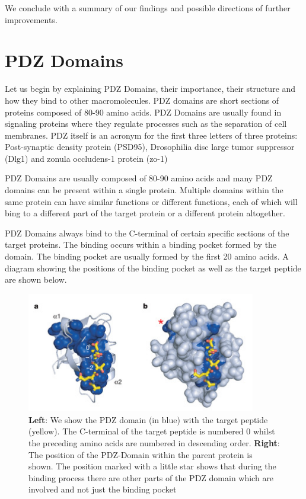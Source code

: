 \documentclass[a4paper, 12pt]{article}
\begin{document}
	We conclude with a summary of our findings and possible directions of further improvements. 

	\section{PDZ Domains}

	Let us begin by explaining PDZ Domains, their importance, their structure and how they bind to other macromolecules. PDZ domains are short sections of proteins composed of 80-90 amino acids. PDZ Domains are usually found in signaling proteins where they regulate processes such as the separation of cell membranes. PDZ itself is an acronym for the first three letters of three proteins: Post-synaptic density protein (PSD95), Drosophilia disc large tumor suppressor (Dlg1) and zonula occludens-1 protein (zo-1)

	PDZ Domains are usually composed of 80-90 amino acids and many PDZ domains can be present within a single protein. Multiple domains within the same protein can have similar functions or different functions, each of which will bing to a different part of the target protein or a different protein altogether.

	PDZ Domains always bind to the C-terminal of certain specific sections of the target proteins. The binding occurs within a binding pocket formed by the domain. The binding pocket are usually formed by the first 20 amino acids. A diagram showing the positions of the binding pocket as well as the target peptide are shown below. 

	\begin{figure}
	\label{PDZ_Positions}
	\centering
	\includegraphics[width=10cm]{Images/pdz.jpg}
	\caption{\textbf{Left}: We show the PDZ domain (in blue) with the target peptide (yellow). The C-terminal of the target peptide is numbered 0 whilst the preceding amino acids are numbered in descending order. 
	\textbf{Right}: The position of the PDZ-Domain within the parent protein is shown. The position marked with a little star shows that during the binding process there are other parts of the PDZ domain which are involved and not just the binding pocket}
	\end{figure}	
\end{document}
